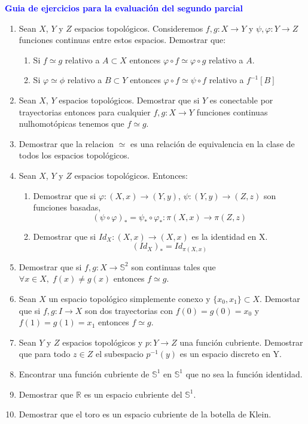 \documentclass[12pts]{report}
\newcommand{\R}{\mathbb R}
\newcommand{\s}{\mathbb S}
\begin{document}
\begin{center}
\textcolor{blue}{\textbf{\large Guia de ejercicios para la evaluación del segundo parcial}}
\end{center}

\begin{enumerate}
\item Sean $X$, $Y$ y $Z$ espacios topológicos. Consideremos $f,g: X\to Y$ y $\psi ,\varphi: Y \to Z$ funciones continuas entre estos espacios. Demostrar que:
\begin{enumerate}
\item Si $f\simeq g$ relativo a $A\subset X$ entonces $\varphi \circ f \simeq \varphi\circ g$ relativo a $A$.
\item Si $\varphi \simeq \phi$ relativo a $B\subset Y$ entonces $\varphi \circ f \simeq \psi \circ f$ relativo a $f^{-1}[B]$
\end{enumerate} 
\item Sean $X$, $Y$ espacios topológicos. Demostrar que si $Y$ es conectable por trayectorias entonces para cualquier $f,g : X\to Y$ funciones continuas nulhomotópicas tenemos que $f\simeq g$.
\item Demostrar que la relacion $\simeq$ es una relación de equivalencia en la clase de todos los espacios topológicos.
\item Sean $X$, $Y$ y $Z$ espacios topológicos. Entonces:
\begin{enumerate}
\item Demostrar que si $\varphi: (X,x) \to (Y,y)$, $\psi: (Y,y) \to (Z,z)$ son funciones basadas,
$$(\psi \circ \varphi)_* = \psi_*\circ \varphi_* : \pi(X,x)\to \pi(Z,z)$$
\item Demostrar que si $Id_X: (X,x)\to (X,x)$ es la identidad en X.
$$(Id_X)_* = Id_{\pi(X,x)}$$
\end{enumerate}
\item Demostrar que si $f,g :X \to \s^2$ son continuas tales que $\forall x\in X,\; f(x)\neq g(x)$ entonces $f\simeq g$.
\item Sean $X$ un espacio topológico simplemente conexo y $\{x_0,x_1\}\subset X$. Demostar que si $f,g: I \to X$ son dos trayectorias con $f(0)=g(0)=x_0$ y $f(1)=g(1)=x_1$ entonces $f\simeq g$.
\item Sean $Y$ y $Z$ espacios topológicos y $p: Y \to Z$ una función cubriente. Demostrar que para todo $z\in Z$ el subespacio $p^{-1}(y)$ es un espacio discreto en Y.
\item Encontrar una función cubriente de $\s^1$ en $\s^1$ que no sea la función identidad.
\item Demostrar que $\R$ es un espacio cubriente del $\s^1$.
\item Demostrar que el toro es un espacio cubriente de la botella de Klein.


\end{enumerate}
\end{document}
